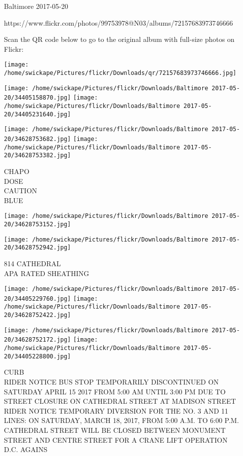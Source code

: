 \documentclass[10pt,letterpaper]{article}
\begin{document}
Baltimore 2017-05-20

https://www.flickr.com/photos/99753978@N03/albums/72157683973746666

Scan the QR code below to go to the original album with full-size photos on Flickr:

\texttt{[image: /home/swickape/Pictures/flickr/Downloads/qr/72157683973746666.jpg]}
\pagebreak

\texttt{[image: /home/swickape/Pictures/flickr/Downloads/Baltimore 2017-05-20/34405158870.jpg]}
\texttt{[image: /home/swickape/Pictures/flickr/Downloads/Baltimore 2017-05-20/34405231640.jpg]}

\texttt{[image: /home/swickape/Pictures/flickr/Downloads/Baltimore 2017-05-20/34628753682.jpg]}
\texttt{[image: /home/swickape/Pictures/flickr/Downloads/Baltimore 2017-05-20/34628753382.jpg]}

CHAPO\\
DOSE\\
CAUTION\\
BLUE\\
\pagebreak

\texttt{[image: /home/swickape/Pictures/flickr/Downloads/Baltimore 2017-05-20/34628753152.jpg]}

\vspace{0.25in}
\texttt{[image: /home/swickape/Pictures/flickr/Downloads/Baltimore 2017-05-20/34628752942.jpg]}

814 CATHEDRAL\\
APA RATED SHEATHING\\
\pagebreak

\texttt{[image: /home/swickape/Pictures/flickr/Downloads/Baltimore 2017-05-20/34405229760.jpg]}
\texttt{[image: /home/swickape/Pictures/flickr/Downloads/Baltimore 2017-05-20/34628752422.jpg]}

\texttt{[image: /home/swickape/Pictures/flickr/Downloads/Baltimore 2017-05-20/34628752172.jpg]}
\texttt{[image: /home/swickape/Pictures/flickr/Downloads/Baltimore 2017-05-20/34405228800.jpg]}

CURB\\
RIDER NOTICE BUS STOP TEMPORARILY DISCONTINUED ON SATURDAY APRIL 15 2017 FROM 5:00 AM UNTIL 3:00 PM DUE TO STREET CLOSURE ON CATHEDRAL STREET AT MADISON STREET\\
RIDER NOTICE TEMPORARY DIVERSION FOR THE NO. 3 AND 11 LINES: ON SATURDAY, MARCH 18, 2017, FROM 5:00 A.M. TO 6:00 P.M. CATHEDRAL STREET WILL BE CLOSED BETWEEN MONUMENT STREET AND CENTRE STREET FOR A CRANE LIFT OPERATION\\
D.C. AGAINS\\
\pagebreak
\end{document}
